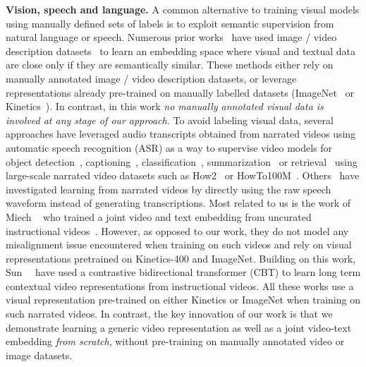 \documentclass[10pt,twocolumn,letterpaper]{article}
\begin{document}
\noindent
\textbf{Vision, speech and language.}
A common alternative to training visual models using manually defined sets of labels is to exploit semantic supervision from natural language or speech.
Numerous prior works~\cite{chowdhury2018webly,dong19dual,gong14multi,gong14improving,klein15associating,miech18learning,
mithun2018learning,pan16jointly,plummer2017enhancing,xu2015jointly,
wang2018learning,wang2016learning,wray2019fine,wu2017sampling} have used image / video description datasets~\cite{lin14coco, plummer2015flickr30k, rohrbach17movie, xu16msrvtt, youcook2} to learn an embedding space where visual and textual data are close only if they are semantically similar.
These methods either rely on manually annotated image / video description datasets, or leverage representations already pre-trained on manually labelled datasets (\eg ImageNet~\cite{imagenet} or Kinetics~\cite{carreira2017quovadis}). 
In contrast, in this work \textit{no manually annotated visual data is involved at any stage of our approach.}
To avoid labeling visual data, several approaches have leveraged audio transcripts obtained from narrated videos using automatic speech recognition (ASR) as a way to supervise video models for object detection~\cite{amrani2019toward, chen17discover, moriya2019grounding}, captioning~\cite{hessel2019case,sun2019videobert}, classification~\cite{alayrac16unsupervised,kuehne2019mining, malmaud15what,yu14instructional}, summarization~\cite{palaskar2019multimodal} or retrieval~\cite{miech19howto100m} using large-scale narrated video datasets such as How2~\cite{sanabria18how2} or HowTo100M~\cite{miech19howto100m}.
Others~\cite{boggust2019grounding, harwath18jointly} have investigated learning from narrated videos by directly using the raw speech waveform instead of generating transcriptions.
Most related to us is the work of Miech \etal~\cite{miech19howto100m} who trained a joint video and text embedding from uncurated instructional videos~\cite{miech19howto100m}.
However, as opposed to our work, they do not model any misalignment issue encountered when training on such videos and 
rely on visual representations pretrained on Kinetics-400 and ImageNet.
Building on this work, Sun~\etal~\cite{sun2019contrastive} have used a contrastive bidirectional transformer (CBT) to learn long term contextual video representations from instructional videos. 
All these works use a visual representation pre-trained on either Kinetics or ImageNet when training on such narrated videos.
In contrast, the key innovation of our work is that we demonstrate learning a generic video representation as well as a joint video-text embedding {\em from scratch}, without pre-training on manually annotated video or image datasets. 
\end{document}
